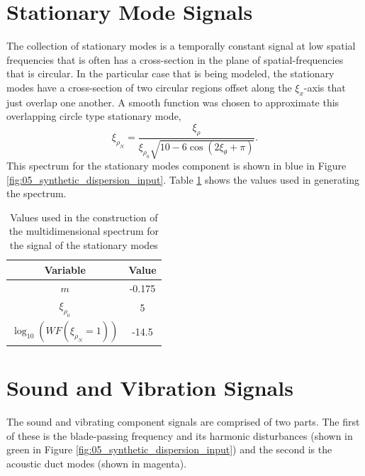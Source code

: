 \section{Stationary Mode Signals}
The collection of stationary modes is a temporally constant signal at low spatial frequencies that is often has a cross-section in the plane of spatial-frequencies that is circular.
In the particular case that is being modeled, the stationary modes have a cross-section of two circular regions offset along the $\xi_x$-axis that just overlap one another.
A smooth function was chosen to approximate this overlapping circle type stationary mode,
\begin{equation}
 \xi_{\rho_N} = \frac{\xi_\rho}{\xi_{\rho_0}\sqrt{10-6\cos{(2\xi_\theta+\pi)}}} \textrm{.}
 \label{eqn:05_epicycloid_simple}
\end{equation}
This spectrum for the stationary modes component is shown in blue in Figure \ref{fig:05_synthetic_dispersion_input}.
Table \ref{tab:05_stationary_modes} shows the values used in generating the spectrum.
\begin{table}
  \centering
  \caption{Values used in the construction of the multidimensional spectrum for the signal of the stationary modes}
  \begin{tabular}{c c}
    Variable & Value \\
    \hline \hline
    $m$ & -0.175 \\
    $\xi_{\rho_0}$ & 5 \\
    $\log_{10}(WF(\xi_{\rho_N}=1))$ & -14.5
  \end{tabular}
  \label{tab:05_stationary_modes}
\end{table}

\section{Sound and Vibration Signals}
The sound and vibrating component signals are comprised of two parts.
The first of these is the blade-passing frequency and its harmonic disturbances (shown in green in Figure \ref{fig:05_synthetic_dispersion_input}) and the second is the acoustic duct modes (shown in magenta).

